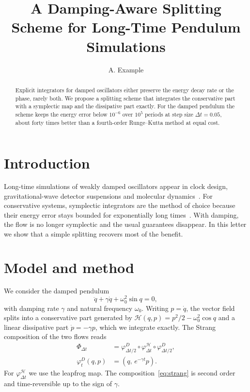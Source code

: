 \documentclass[aps,pra,twocolumn]{revtex4-2}
\newcommand{\dt}{\Delta t}
\newcommand{\Ham}{\mathcal{H}}
\begin{document}
\title{A Damping-Aware Splitting Scheme for Long-Time Pendulum Simulations}
\author{A. Example}

\begin{abstract}
Explicit integrators for damped oscillators either preserve the energy decay
rate or the phase, rarely both. We propose a splitting scheme that integrates
the conservative part with a symplectic map and the dissipative part exactly.
For the damped pendulum the scheme keeps the energy error below $10^{-6}$ over
$10^{5}$ periods at step size $\dt = 0.05$, about forty times better than a
fourth-order Runge--Kutta method at equal cost.
\end{abstract}

\maketitle

\section{Introduction}
Long-time simulations of weakly damped oscillators appear in clock design,
gravitational-wave detector suspensions and molecular dynamics~\cite{hairer2006,leimkuhler2004}.
For conservative systems, symplectic integrators are the method of choice because
their energy error stays bounded for exponentially long times~\cite{hairer2006}.
With damping, the flow is no longer symplectic and the usual guarantees disappear.
In this letter we show that a simple splitting recovers most of the benefit.

\section{Model and method}
We consider the damped pendulum
\begin{equation}
  \ddot{q} + \gamma \dot{q} + \omega_0^2 \sin q = 0, \label{eq:model}
\end{equation}
with damping rate $\gamma$ and natural frequency $\omega_0$. Writing $p=\dot q$, the
vector field splits into a conservative part generated by
$\Ham(q,p) = p^2/2 - \omega_0^2 \cos q$ and a linear dissipative part
$\dot p = -\gamma p$, which we integrate exactly.
The Strang composition of the two flows reads
\begin{align}
  \Phi_{\dt} &= \varphi^{D}_{\dt/2} \circ \varphi^{\Ham}_{\dt} \circ \varphi^{D}_{\dt/2}, \label{eq:strang}\\
  \varphi^{D}_{t}(q,p) &= (q,\, e^{-\gamma t} p). \nonumber
\end{align}
For $\varphi^{\Ham}_{\dt}$ we use the leapfrog map. The composition~\eqref{eq:strang}
is second order and time-reversible up to the sign of $\gamma$.
\end{document}
